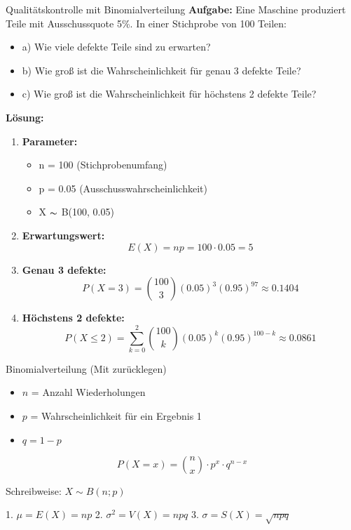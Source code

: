 \begin{example2}{Qualitätskontrolle mit Binomialverteilung}
\textbf{Aufgabe:} Eine Maschine produziert Teile mit Ausschussquote 5\%. In einer Stichprobe von 100 Teilen:
\begin{itemize}
\item a) Wie viele defekte Teile sind zu erwarten?
\item b) Wie groß ist die Wahrscheinlichkeit für genau 3 defekte Teile?
\item c) Wie groß ist die Wahrscheinlichkeit für höchstens 2 defekte Teile?
\end{itemize}

\textbf{Lösung:}
\begin{enumerate}
\item \textbf{Parameter:}
   \begin{itemize}
   \item n = 100 (Stichprobenumfang)
   \item p = 0.05 (Ausschusswahrscheinlichkeit)
   \item X $\thicksim$ B(100, 0.05)
   \end{itemize}

\item \textbf{Erwartungswert:}
   $$E(X) = np = 100 \cdot 0.05 = 5$$

\item \textbf{Genau 3 defekte:}
   $$P(X=3) = \binom{100}{3}(0.05)^3(0.95)^{97} \approx 0.1404$$

\item \textbf{Höchstens 2 defekte:}
   $$P(X \leq 2) = \sum_{k=0}^2 \binom{100}{k}(0.05)^k(0.95)^{100-k} \approx 0.0861$$
\end{enumerate}
\end{example2}

\begin{definition}{Binomialverteilung (Mit zurücklegen)}
\begin{itemize}
  \item $n$ = Anzahl Wiederholungen
  \item $p$ = Wahrscheinlichkeit für ein Ergebnis 1
  \item $q = 1-p$
\end{itemize}

$$P(X=x) = \binom{n}{x} \cdot p^x \cdot q^{n-x}$$

Schreibweise: $X \sim B(n;p)$

1. $\mu = E(X) = np$
2. $\sigma^2 = V(X) = npq$
3. $\sigma = S(X) = \sqrt{npq}$
\end{definition}

